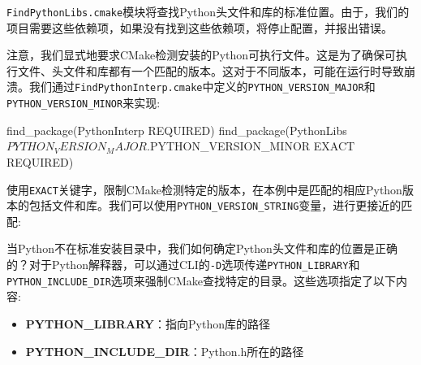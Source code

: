 

\texttt{FindPythonLibs.cmake}模块将查找Python头文件和库的标准位置。由于，我们的项目需要这些依赖项，如果没有找到这些依赖项，将停止配置，并报出错误。

注意，我们显式地要求CMake检测安装的Python可执行文件。这是为了确保可执行文件、头文件和库都有一个匹配的版本。这对于不同版本，可能在运行时导致崩溃。我们通过\texttt{FindPythonInterp.cmake}中定义的\texttt{PYTHON\_VERSION\_MAJOR}和\texttt{PYTHON\_VERSION\_MINOR}来实现:

\begin{codebox}[cmake]
find_package(PythonInterp REQUIRED)
find_package(PythonLibs ${PYTHON_VERSION_MAJOR}.${PYTHON_VERSION_MINOR} EXACT REQUIRED)
\end{codebox}

使用\texttt{EXACT}关键字，限制CMake检测特定的版本，在本例中是匹配的相应Python版本的包括文件和库。我们可以使用\texttt{PYTHON\_VERSION\_STRING}变量，进行更接近的匹配:



当Python不在标准安装目录中，我们如何确定Python头文件和库的位置是正确的？对于Python解释器，可以通过CLI的\texttt{-D}选项传递\texttt{PYTHON\_LIBRARY}和\texttt{PYTHON\_INCLUDE\_DIR}选项来强制CMake查找特定的目录。这些选项指定了以下内容:

\begin{itemize}
\item \textbf{PYTHON\_LIBRARY}：指向Python库的路径

\item \textbf{PYTHON\_INCLUDE\_DIR}：Python.h所在的路径

\end{itemize}


